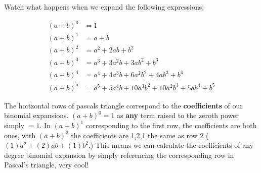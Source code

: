 \documentclass{article}
\begin{document}
{\center Watch what happens when we expand the following expressions:}
 
\begin{align*}
  (a + b)^0 &= 1\\
  (a + b)^1 &= a + b\\
  (a + b)^2 &= a^2 + 2ab + b^2\\
  (a + b)^3 &= a^3 + 3a^2b + 3ab^2 + b^3\\
  (a + b)^4 &= a^4 + 4a^3 b + 6a^2b^2 + 4ab^3 + b^4\\
  (a + b)^5 &= a^5 + 5a^4 b + 10a^3 b^2 + 10a^2 b^3 + 5ab^4+b^5
\end{align*} 
 
The horizontal rows of pascals triangle correspond to the {\bfseries coefficients} of our binomial expansions. $(a+b)^0 = 1$ as {\bfseries any} term raised to the zeroth power simply $=1$. In  $(a+b)^1$ corresponding to the first row, the coefficients are both ones, with $(a+b)^2$ the coefficients are 1,2,1 the same as row 2 ($(1) a^2+(2) ab+(1) b^2$.)
This means we can calculate the coefficients of any degree binomial expansion by simply referencing the corresponding row in Pascal's triangle, very cool!
  
\end{document}
